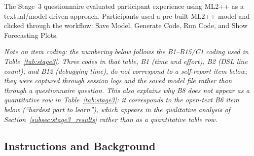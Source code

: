 The Stage~3 questionnaire evaluated participant experience using ML2++ as a textual/model-driven approach. Participants used a pre-built ML2++ model and clicked through the workflow: Save Model, Generate Code, Run Code, and Show Forecasting Plots.

\emph{Note on item coding: the numbering below follows the B1--B15/C1 coding used in Table~\ref{tab:stage3}. Three codes in that table, B1 (time and effort), B2 (DSL line count), and B12 (debugging time), do not correspond to a self-report item below; they were captured through session logs and the saved model file rather than through a questionnaire question. This also explains why B8 does not appear as a quantitative row in Table~\ref{tab:stage3}: it corresponds to the open-text B6 item below (``hardest part to learn''), which appears in the qualitative analysis of Section~\ref{subsec:stage3_results} rather than as a quantitative table row.}

\subsection{Instructions and Background}
\label{app:stage3_background_questions}

